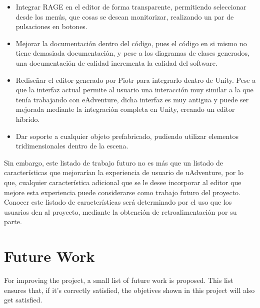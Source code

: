 \begin{itemize}
	\item Integrar RAGE en el editor de forma transparente, permitiendo seleccionar desde los menús, que cosas se desean monitorizar, realizando un par de pulsaciones en botones.
	
	\item Mejorar la documentación dentro del código, pues el código en si mismo no tiene demasiada documentación, y pese a los diagramas de clases generados, una documentación de calidad incrementa la calidad del software.
	
	\item Rediseñar el editor generado por Piotr para integrarlo dentro de Unity. Pese a que la interfaz actual permite al usuario una interacción muy similar a la que tenía trabajando con eAdventure, dicha interfaz es muy antigua y puede ser mejorada mediante la integración completa en Unity, creando un editor híbrido.
	
	\item Dar soporte a cualquier objeto prefabricado, pudiendo utilizar elementos tridimensionales dentro de la escena.
\end{itemize}

Sin embargo, este listado de trabajo futuro no es más que un listado de características que mejorarían la experiencia de usuario de uAdventure, por lo que, cualquier característica adicional que se le desee incorporar al editor que mejore esta experiencia puede considerarse como trabajo futuro del proyecto. Conocer este listado de características será determinado por el uso que los usuarios den al proyecto, mediante la obtención de retroalimentación por su parte.

\chapter{Future Work}

For improving the project, a small list of future work is proposed. This list ensures that, if it's correctly satisfied, the objetives shown in this project will also get satisfied.

